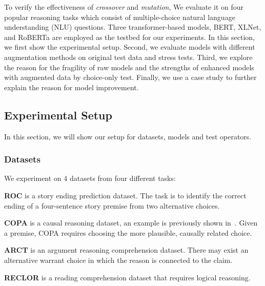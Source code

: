 
To verify the effectiveness of \textit{crossover} and 
\textit{mutation}, We evaluate it on four popular reasoning tasks 
which consist of multiple-choice natural language understanding (NLU) questions. 
Three transformer-based models, BERT, XLNet, and RoBERTa are employed as the
testbed for our experiments. 
In this section, we first show the experimental setup. 
Second, we evaluate models with different augmentation methods on original test data and 
stress tests. 
Third, we explore the reason for the fragility of raw models and 
the strengths of enhanced models with augmented data by choice-only test. 
Finally, we use a case study to further explain the reason for model improvement.

\subsection{Experimental Setup} 
\label{sec:setup}
In this section, we will show our setup for datasets, models and test operators.
\subsubsection{Datasets}
We experiment on 4 datasets from four different tasks:

\textbf{ROC} is a story ending prediction dataset. 
The task is to identify the correct ending of a four-sentence 
story premise from two alternative choices. 

\textbf{COPA} is a causal reasoning dataset, an example is previously shown
in~. Given a premise, 
COPA requires choosing the more plausible, causally related choice. 

\textbf{ARCT} is an argument reasoning comprehension dataset. 
There may exist an alternative warrant choice 
in which the reason is connected to the claim.

\textbf{RECLOR} is a reading comprehension dataset that requires logical reasoning.


